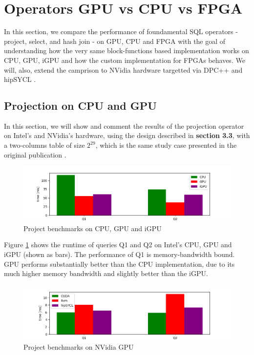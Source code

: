 \documentclass[sigconf, nonacm]{acmart}
\begin{document}
\section{Operators GPU vs CPU vs FPGA}
In this section, we compare the performance of foundamental SQL operators - project, select, and hash join - on GPU, CPU and FPGA with the goal of understanding how the very same block-functions based implementation works on CPU, GPU, iGPU and how the custom implementation for FPGAs behaves. We will, also, extend the camprison to NVidia hardware targetted via DPC++ and hipSYCL \cite{hipsycl}.

\subsection{Projection on CPU and GPU}
In this section, we will show and comment the results of the projection operator on Intel's and NVidia's hardware, using the design described in \textbf{section 3.3}, with a two-columns table of size $2^{29}$, which is the same study case presented in the original publication \cite{crystal}.

\begin{figure}[H]
  \centering
  \includegraphics[width=\linewidth]{figures/project_intel.png}
  \caption{Project benchmarks on CPU, GPU and iGPU}
    \label{fig:proj-intel}
\end{figure}

Figure \ref{fig:proj-intel} shows the runtime of
queries Q1 and Q2 on Intel's CPU, GPU and iGPU (shown as bars). The performance of Q1
is memory-bandwidth bound. GPU performs substantially better than the CPU implementation, due to its much higher memory bandwidth and slightly better than the iGPU. 

\begin{figure}[H]
  \centering
  \includegraphics[width=\linewidth]{figures/project_nvidia.png}
  \caption{Project benchmarks on NVidia GPU}
    \label{fig:project-nvidia}
\end{figure}
\end{document}

